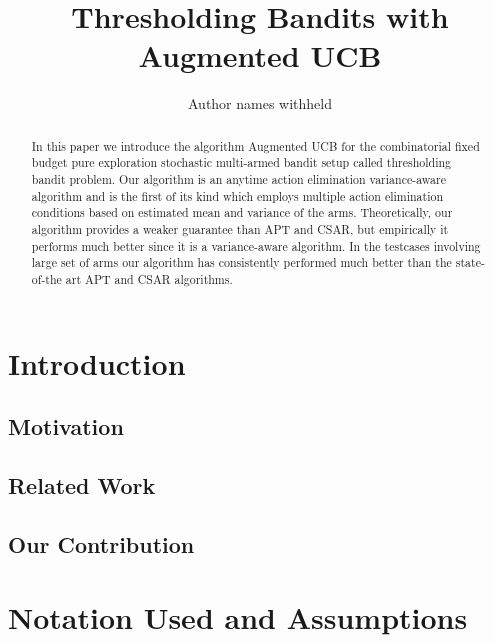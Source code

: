 \documentclass{article}
\title{Thresholding Bandits with Augmented UCB}
\author{Author names withheld}
\begin{document}
\maketitle

\begin{abstract}
In this paper we introduce the algorithm Augmented UCB for the combinatorial fixed budget pure exploration stochastic multi-armed bandit setup called thresholding bandit problem. Our algorithm is an anytime action elimination variance-aware algorithm and is the first of its kind which employs multiple action elimination conditions based on estimated mean and variance of the arms. Theoretically, our algorithm provides a weaker guarantee than APT\cite{locatelli2016optimal} and CSAR\cite{chen2014combinatorial}, but empirically it performs much better since it is a variance-aware algorithm. In the testcases involving large set of arms our algorithm has consistently performed much better than the state-of-the art APT and CSAR algorithms.  
\end{abstract}


\section{Introduction}
\label{intro}


\subsection{Motivation}
\label{motivation}


\subsection{Related Work}
\label{prevRes}


\subsection{Our Contribution}
\label{contribution}


\section{Notation Used and Assumptions}
\label{notation}

\end{document}
